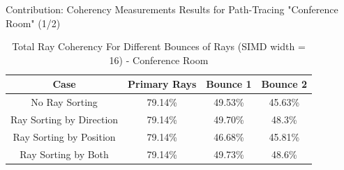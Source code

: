 \documentclass{beamer}
\begin{document}
\begin{frame}{Contribution: Coherency Measurements Results for Path-Tracing "Conference Room" (1/2)}
	\begin{table}[ht]  
		\centering %
		\begin{tabular}{c c c c} %
			\hline %
			
			Case & Primary Rays & Bounce 1 & Bounce 2 \\ [0.5ex] %
			
			\hline %
			No Ray Sorting &  79.14\% & 49.53\% & 45.63\% \\ %
			Ray Sorting by Direction & 79.14\% & 49.70\% & 48.3\% \\ 
			Ray Sorting by Position &    79.14\% & 46.68\%  & 45.81\% \\ 
			Ray Sorting by Both & 79.14\% & 49.73\% & 48.6\% \\ [1ex]
			\hline %
		\end{tabular} 
	\caption{Total Ray Coherency For Different Bounces of Rays (SIMD width = 16) - Conference Room} %
		\label{table:ConfRenderCoh} %
	\end{table} 
\end{frame}
\end{document}
